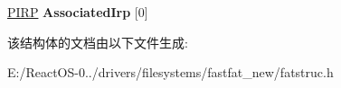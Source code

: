\begin{DoxyCompactItemize}
\begin{tabbing}
\end{tabbing}\item 
\mbox{\label{struct___f_a_t___i_o___c_o_n_t_e_x_t_a86ca257925da255240ca403300fa3844}} 
\hyperlink{interfacevoid}{P\+I\+RP} {\bfseries Associated\+Irp} \mbox{[}0\mbox{]}
\end{DoxyCompactItemize}


该结构体的文档由以下文件生成\+:\begin{DoxyCompactItemize}
\item 
E\+:/\+React\+O\+S-\/0../drivers/filesystems/fastfat\+\_\+new/fatstruc.\+h\end{DoxyCompactItemize}
